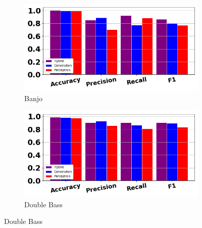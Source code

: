 \documentclass[12pt,letterpaper]{article}
\begin{document}
\begin{figure}[H]
	\begin{subfigure}[b]{0.45\textwidth}
	\centering
	\includegraphics[width=\textwidth]{../FiguresClasses/Banjo}
	\caption{Banjo}
	\end{subfigure}	
	\hfill
	\begin{subfigure}[b]{0.45\textwidth}
	\centering
	\includegraphics[width=\textwidth]{../FiguresClasses/Bass}
	\caption{Double Bass}
	\end{subfigure}	
	

\end{figure}
\end{document}
